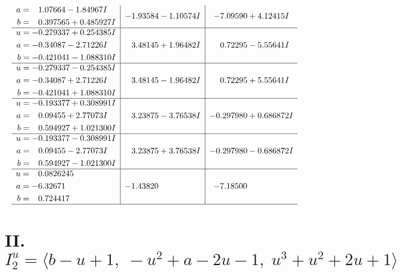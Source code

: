 \documentclass[1p]{elsarticle_modified}
\theoremstyle{definition}
\begin{document}
$$\begin{array}{c|c|c}
\begin{aligned}
a &= \phantom{-}1.07664 - 1.84967 I \\
b &= \phantom{-}0.397565 + 0.485927 I\end{aligned}
 & -1.93584 - 1.10574 I & -7.09590 + 4.12415 I \\ \hline\begin{aligned}
u &= -0.279337 + 0.254385 I \\
a &= -0.34087 - 2.71226 I \\
b &= -0.421041 - 1.088310 I\end{aligned}
 & \phantom{-}3.48145 + 1.96482 I & \phantom{-}0.72295 - 5.55641 I \\ \hline\begin{aligned}
u &= -0.279337 - 0.254385 I \\
a &= -0.34087 + 2.71226 I \\
b &= -0.421041 + 1.088310 I\end{aligned}
 & \phantom{-}3.48145 - 1.96482 I & \phantom{-}0.72295 + 5.55641 I \\ \hline\begin{aligned}
u &= -0.193377 + 0.308991 I \\
a &= \phantom{-}0.09455 + 2.77073 I \\
b &= \phantom{-}0.594927 + 1.021300 I\end{aligned}
 & \phantom{-}3.23875 - 3.76538 I & -0.297980 + 0.686872 I \\ \hline\begin{aligned}
u &= -0.193377 - 0.308991 I \\
a &= \phantom{-}0.09455 - 2.77073 I \\
b &= \phantom{-}0.594927 - 1.021300 I\end{aligned}
 & \phantom{-}3.23875 + 3.76538 I & -0.297980 - 0.686872 I \\ \hline\begin{aligned}
u &= \phantom{-}0.0826245\phantom{ +0.000000I} \\
a &= -6.32671\phantom{ +0.000000I} \\
b &= \phantom{-}0.724417\phantom{ +0.000000I}\end{aligned}
 & -1.43820\phantom{ +0.000000I} & -7.18500\phantom{ +0.000000I}\\
 \hline 
 \end{array}$$\newpage\newpage\renewcommand{\arraystretch}{1}
\centering \section*{II. $I^u_{2}= \langle b- u+1,\;- u^2+a-2 u-1,\;u^3+u^2+2 u+1 \rangle$}
\end{document}
